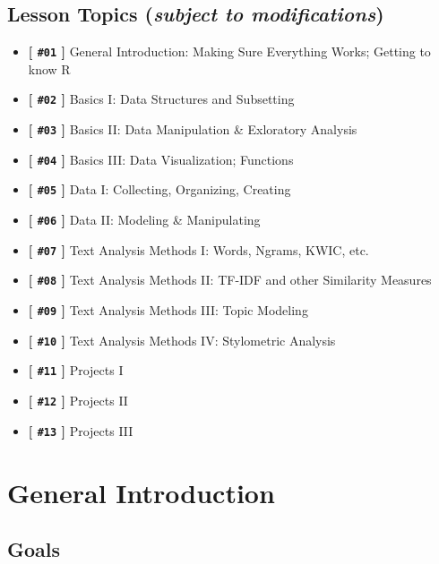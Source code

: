 \documentclass[
]{book}
\providecommand{\tightlist}{%
  \setlength{\itemsep}{0pt}\setlength{\parskip}{0pt}}
\begin{document}
\hypertarget{lesson-topics-subject-to-modifications}{%
\section{\texorpdfstring{Lesson Topics (\emph{subject to modifications})}{Lesson Topics (subject to modifications)}}\label{lesson-topics-subject-to-modifications}}

\begin{itemize}
\tightlist
\item
  \textbf{{[} \texttt{\#01} {]}} General Introduction: Making Sure Everything Works; Getting to know R
\item
  \textbf{{[} \texttt{\#02} {]}} Basics I: Data Structures and Subsetting
\item
  \textbf{{[} \texttt{\#03} {]}} Basics II: Data Manipulation \& Exloratory Analysis
\item
  \textbf{{[} \texttt{\#04} {]}} Basics III: Data Visualization; Functions
\item
  \textbf{{[} \texttt{\#05} {]}} Data I: Collecting, Organizing, Creating
\item
  \textbf{{[} \texttt{\#06} {]}} Data II: Modeling \& Manipulating
\item
  \textbf{{[} \texttt{\#07} {]}} Text Analysis Methods I: Words, Ngrams, KWIC, etc.
\item
  \textbf{{[} \texttt{\#08} {]}} Text Analysis Methods II: TF-IDF and other Similarity Measures
\item
  \textbf{{[} \texttt{\#09} {]}} Text Analysis Methods III: Topic Modeling
\item
  \textbf{{[} \texttt{\#10} {]}} Text Analysis Methods IV: Stylometric Analysis
\item
  \textbf{{[} \texttt{\#11} {]}} Projects I
\item
  \textbf{{[} \texttt{\#12} {]}} Projects II
\item
  \textbf{{[} \texttt{\#13} {]}} Projects III
\end{itemize}

\hypertarget{general-introduction}{%
\chapter{General Introduction}\label{general-introduction}}

\hypertarget{L01_goals}{%
\section{Goals}\label{L01_goals}}
\end{document}
